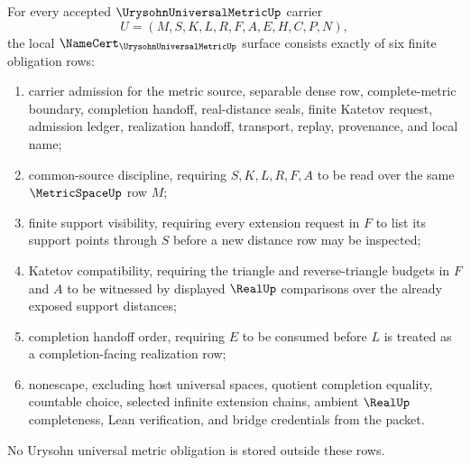 \begin{theorem}\label{thm:urysohn-universal-metric-namecert-obligations}
For every accepted $\UrysohnUniversalMetricUp$ carrier
$$
U=(M,S,K,L,R,F,A,E,H,C,P,N),
$$
the local $\NameCert_{\UrysohnUniversalMetricUp}$ surface consists exactly of six finite obligation rows:
\begin{enumerate}
\item carrier admission for the metric source, separable dense row, complete-metric boundary, completion handoff, real-distance seals, finite Katetov request, admission ledger, realization handoff, transport, replay, provenance, and local name;
\item common-source discipline, requiring $S,K,L,R,F,A$ to be read over the same $\MetricSpaceUp$ row $M$;
\item finite support visibility, requiring every extension request in $F$ to list its support points through $S$ before a new distance row may be inspected;
\item Katetov compatibility, requiring the triangle and reverse-triangle budgets in $F$ and $A$ to be witnessed by displayed $\RealUp$ comparisons over the already exposed support distances;
\item completion handoff order, requiring $E$ to be consumed before $L$ is treated as a completion-facing realization row;
\item nonescape, excluding host universal spaces, quotient completion equality, countable choice, selected infinite extension chains, ambient $\RealUp$ completeness, Lean verification, and bridge credentials from the packet.
\end{enumerate}
No Urysohn universal metric obligation is stored outside these rows.
\end{theorem}
